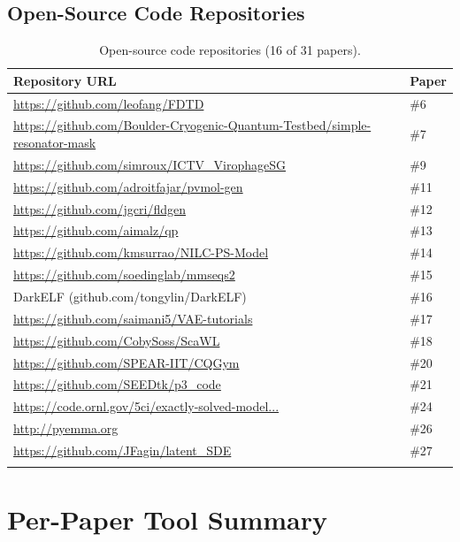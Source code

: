 \documentclass[11pt,letterpaper]{article}
\begin{document}
\subsection{Open-Source Code Repositories}

\begin{longtable}{p{9.5cm} l}
\toprule
\textbf{Repository URL} & \textbf{Paper} \\
\midrule
\url{https://github.com/leofang/FDTD} & \#6 \\
\url{https://github.com/Boulder-Cryogenic-Quantum-Testbed/simple-resonator-mask} & \#7 \\
\url{https://github.com/simroux/ICTV_VirophageSG} & \#9 \\
\url{https://github.com/adroitfajar/pvmol-gen} & \#11 \\
\url{https://github.com/jgcri/fldgen} & \#12 \\
\url{https://github.com/aimalz/qp} & \#13 \\
\url{https://github.com/kmsurrao/NILC-PS-Model} & \#14 \\
\url{https://github.com/soedinglab/mmseqs2} & \#15 \\
DarkELF (github.com/tongylin/DarkELF) & \#16 \\
\url{https://github.com/saimani5/VAE-tutorials} & \#17 \\
\url{https://github.com/CobySoss/ScaWL} & \#18 \\
\url{https://github.com/SPEAR-IIT/CQGym} & \#20 \\
\url{https://github.com/SEEDtk/p3_code} & \#21 \\
\url{https://code.ornl.gov/5ci/exactly-solved-model...} & \#24 \\
\url{http://pyemma.org} & \#26 \\
\url{https://github.com/JFagin/latent_SDE} & \#27 \\
\bottomrule
\caption{Open-source code repositories (16 of 31 papers).}
\end{longtable}

\section{Per-Paper Tool Summary}
\end{document}
